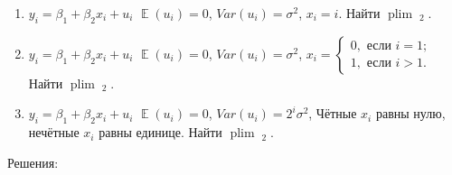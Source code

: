 \documentclass[10pt, a4paper]{extarticle}
\DeclareMathOperator{\E}{\mathbb{E}}
\DeclareMathOperator{\plim}{plim}
\DeclareMathOperator{\hb}{\hat{\beta}}
\begin{document}
\begin{enumerate}
	\item $y_i = \beta_1 + \beta_2 x_i + u_i$
	$\E(u_i) = 0$, $Var(u_i)=\sigma^2$, $x_i = i$.
	Найти $\plim \hb_2$.
	
	\item $y_i = \beta_1 + \beta_2 x_i + u_i$
	$\E(u_i) = 0$, $Var(u_i)=\sigma^2$, 
	$x_i = 
	\begin{cases}
	0, \text{ если } i = 1; \\
	1, \text{ если } i > 1.
	\end{cases}
	$
	Найти $\plim \hb_2$.
	
	\item
	$y_i = \beta_1 + \beta_2 x_i + u_i$
	$\E(u_i) = 0$, $Var(u_i)=2^i\sigma^2$, 
	Чётные $x_i$ равны нулю, нечётные $x_i$ равны единице. Найти $\plim \hb_2$.
	
\end{enumerate}

Решения:
\end{document}
